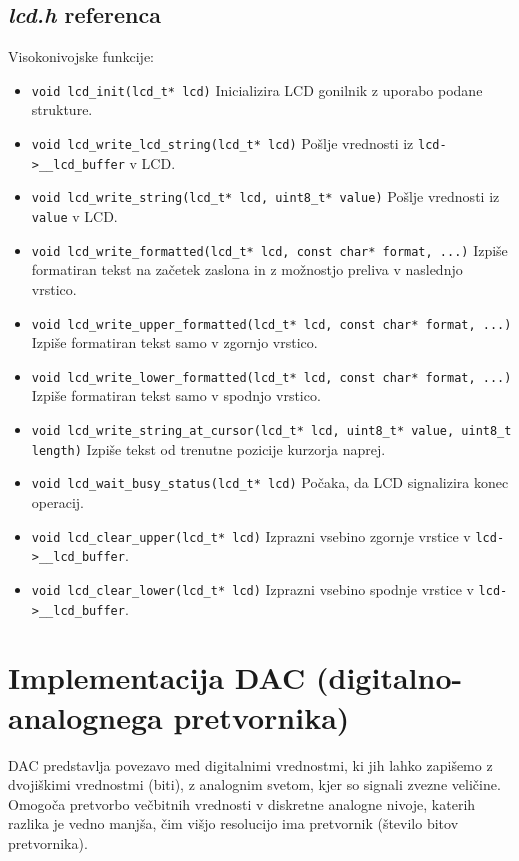 \documentclass[12pt,a4paper,twoside,openright,slovene]{book}
\begin{document}
\subsection{\textit{lcd.h} referenca}

Visokonivojske funkcije:
\begin{itemize}
	\item[] \lstinline{void lcd_init(lcd_t* lcd)}\newline
		Inicializira LCD gonilnik z uporabo podane strukture.
	\item[] \lstinline{void lcd_write_lcd_string(lcd_t* lcd)}\newline
		Pošlje vrednosti iz \lstinline{lcd->__lcd_buffer} v LCD.
	\item[] \lstinline{void lcd_write_string(lcd_t* lcd, uint8_t* value)}\newline
		Pošlje vrednosti iz \lstinline{value} v LCD.
	\item[] \lstinline{void lcd_write_formatted(lcd_t* lcd, const char* format, ...)}\newline
		Izpiše formatiran tekst na začetek zaslona in z možnostjo preliva v naslednjo vrstico.
	\item[] \lstinline{void lcd_write_upper_formatted(lcd_t* lcd, const char* format, ...)}\newline
		Izpiše formatiran tekst samo v zgornjo vrstico.
	\item[] \lstinline{void lcd_write_lower_formatted(lcd_t* lcd, const char* format, ...)}\newline
		Izpiše formatiran tekst samo v spodnjo vrstico.
	\item[] \lstinline{void lcd_write_string_at_cursor(lcd_t* lcd, uint8_t* value, uint8_t length)}\newline
		Izpiše tekst od trenutne pozicije kurzorja naprej.
	\item[] \lstinline{void lcd_wait_busy_status(lcd_t* lcd)}\newline
		Počaka, da LCD signalizira konec operacij.
	\item[] \lstinline{void lcd_clear_upper(lcd_t* lcd)}\newline
		Izprazni vsebino zgornje vrstice v \lstinline{lcd->__lcd_buffer}.
	\item[] \lstinline{void lcd_clear_lower(lcd_t* lcd)}\newline
		Izprazni vsebino spodnje vrstice v \lstinline{lcd->__lcd_buffer}.
\end{itemize}


\section{Implementacija DAC (digitalno-analognega pretvornika)}
DAC predstavlja povezavo med digitalnimi vrednostmi, ki jih lahko zapišemo z dvojiškimi vrednostmi (biti), z analognim svetom, kjer so signali zvezne veličine. Omogoča pretvorbo večbitnih vrednosti v diskretne analogne nivoje, katerih razlika je vedno manjša, čim višjo resolucijo ima pretvornik (število bitov pretvornika).
\end{document}
